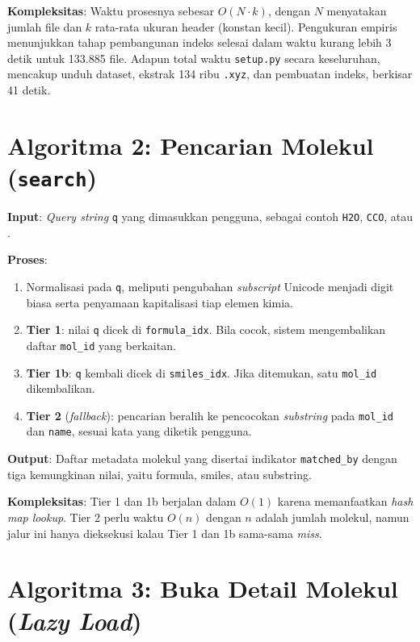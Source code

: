 \documentclass[a4paper,12pt]{report}
\begin{document}
\textbf{Kompleksitas}: Waktu prosesnya sebesar $O(N \cdot k)$, dengan $N$ menyatakan jumlah file dan $k$ rata-rata ukuran header (konstan kecil). Pengukuran empiris menunjukkan tahap pembangunan indeks selesai dalam waktu kurang lebih 3 detik untuk 133.885 file. Adapun total waktu \texttt{setup.py} secara keseluruhan, mencakup unduh dataset, ekstrak 134 ribu \texttt{.xyz}, dan pembuatan indeks, berkisar 41 detik.

\section{Algoritma 2: Pencarian Molekul (\texttt{search})}

\textbf{Input}: \textit{Query string} \texttt{q} yang dimasukkan pengguna, sebagai contoh \texttt{H2O}, \texttt{CCO}, atau .

\textbf{Proses}:

\begin{enumerate}
    \item Normalisasi pada \texttt{q}, meliputi pengubahan \textit{subscript} Unicode menjadi digit biasa serta penyamaan kapitalisasi tiap elemen kimia.
    \item \textbf{Tier 1}: nilai \texttt{q} dicek di \texttt{formula\_idx}. Bila cocok, sistem mengembalikan daftar \texttt{mol\_id} yang berkaitan.
    \item \textbf{Tier 1b}: \texttt{q} kembali dicek di \texttt{smiles\_idx}. Jika ditemukan, satu \texttt{mol\_id} dikembalikan.
    \item \textbf{Tier 2} (\textit{fallback}): pencarian beralih ke pencocokan \textit{substring} pada \texttt{mol\_id} dan \texttt{name}, sesuai kata yang diketik pengguna.
\end{enumerate}

\textbf{Output}: Daftar metadata molekul yang disertai indikator \texttt{matched\_by} dengan tiga kemungkinan nilai, yaitu formula, smiles, atau substring.

\textbf{Kompleksitas}: Tier 1 dan 1b berjalan dalam $O(1)$ karena memanfaatkan \textit{hash map lookup}. Tier 2 perlu waktu $O(n)$ dengan $n$ adalah jumlah molekul, namun jalur ini hanya dieksekusi kalau Tier 1 dan 1b sama-sama \textit{miss}.

\section{Algoritma 3: Buka Detail Molekul (\textit{Lazy Load})}
\end{document}
